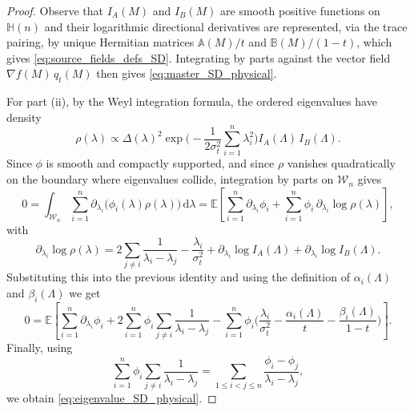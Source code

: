 \documentclass[10pt,a4paper]{amsart}
\newcommand{\EE}{\mathbb{E}}
\newcommand{\HH}{\mathbb{H}(n)}
\newcommand{\dd}{\mathrm{d}}
\begin{document}
\begin{proof}
  Observe that $I_A(M)$ and
$I_B(M)$ are smooth positive functions on $\HH$ and their logarithmic directional derivatives are represented, via the trace pairing, by unique Hermitian matrices $\mathbb A(M)/t$ and $\mathbb B(M)/(1-t)$, which gives \eqref{eq:source_fields_defs_SD}. Integrating by parts against the vector field $\nabla f(M)\,q_t(M)$ then gives \eqref{eq:master_SD_physical}.

For part \textup{(ii)}, by the Weyl integration formula, the
 ordered eigenvalues  have  density
\begin{equation}
\rho(\lambda)
\propto
\Delta(\lambda)^2
\exp\!\Big(-\frac1{2\sigma_t^2}\sum_{i=1}^n \lambda_i^2\Big)
I_A(\Lambda)\,I_B(\Lambda).
\end{equation}
Since $\phi$ is smooth and compactly supported, and since $\rho$ vanishes
quadratically on the boundary where eigenvalues collide,
integration by parts on $\mathcal W_n$ gives
\begin{equation}
0
=
\int_{\mathcal W_n}
\sum_{i=1}^n
\partial_{\lambda_i}\!\big(\phi_i(\lambda)\rho(\lambda)\big)\,\dd\lambda=\EE\!\left[
\sum_{i=1}^n \partial_{\lambda_i}\phi_i
+
\sum_{i=1}^n \phi_i\,\partial_{\lambda_i}\log\rho(\lambda)
\right],
\end{equation}
with
\begin{equation}
\partial_{\lambda_i}\log\rho(\lambda)
=
2\sum_{j\ne i}\frac1{\lambda_i-\lambda_j}
-\frac{\lambda_i}{\sigma_t^2}
+\partial_{\lambda_i}\log I_A(\Lambda)
+\partial_{\lambda_i}\log I_B(\Lambda).
\end{equation}
Substituting this into the previous identity and using the definition of $\alpha_i(\Lambda)$ and $\beta_i(\Lambda)$ we get
\begin{equation}0= \EE\!\left[ \sum_{i=1}^n \partial_{\lambda_i}\phi_i+2\sum_{i=1}^n \phi_i\sum_{j\ne i}\frac1{\lambda_i-\lambda_j}-\sum_{i=1}^n \phi_i\Big( \frac{\lambda_i}{\sigma_t^2} -\frac{\alpha_i(\Lambda)}{t} -\frac{\beta_i(\Lambda)}{1-t} \Big) \right].
\end{equation}
Finally, using
\begin{equation}
\sum_{i=1}^n \phi_i\sum_{j\ne i}\frac1{\lambda_i-\lambda_j}
=
\sum_{1\le i<j\le n}\frac{\phi_i-\phi_j}{\lambda_i-\lambda_j},
\end{equation}
we obtain \eqref{eq:eigenvalue_SD_physical}.
\end{proof}
\end{document}
